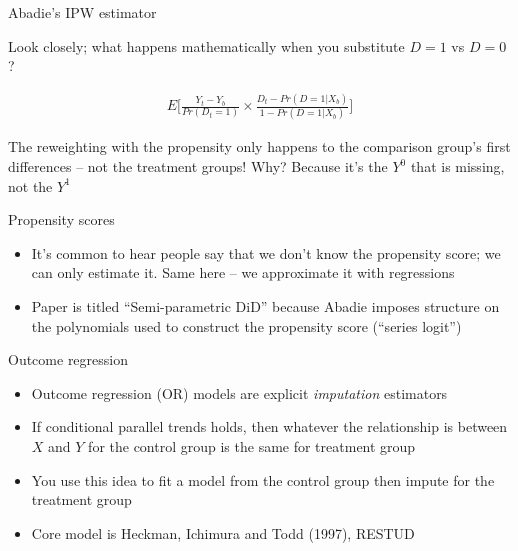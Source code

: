 \documentclass{beamer}
\begin{document}
\begin{frame}{Abadie's IPW estimator}

Look closely; what happens mathematically when you substitute $D=1$ vs $D=0$?

\begin{eqnarray*}
E\bigg [ \frac{Y_t - Y_b}{Pr(D_t=1)} \times \frac{D_t - Pr(D=1|X_b)}{1-Pr(D=1|X_b)} \bigg ]
\end{eqnarray*}

\bigskip

The reweighting with the propensity only happens to the comparison group's first differences -- not the treatment groups!  Why?  Because it's the $Y^0$ that is missing, not the $Y^1$

\end{frame}



\begin{frame}{Propensity scores}

\begin{itemize}
\item It's common to hear people say that we don't know the propensity score; we can only estimate it. Same here -- we approximate it with regressions
\item Paper is titled ``Semi-parametric DiD'' because Abadie imposes structure on the polynomials used to construct the propensity score (``series logit'')
\end{itemize}

\end{frame}







\begin{frame}{Outcome regression }

\begin{itemize}
\item Outcome regression (OR) models are explicit \emph{imputation} estimators
\item If conditional parallel trends holds, then whatever the relationship is between $X$ and $Y$ for the control group is the same for treatment group
\item You use this idea to fit a model from the control group then impute for the treatment group
\item Core model is Heckman, Ichimura and Todd (1997), RESTUD
\end{itemize}

\end{frame}
\end{document}
